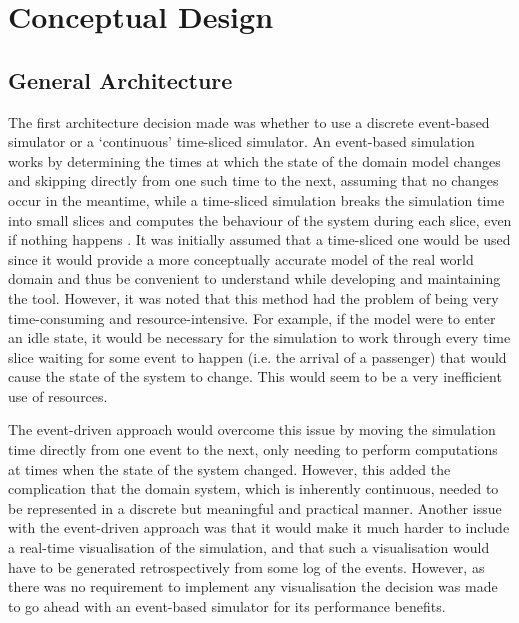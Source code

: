 \documentclass{UoYCSproject}
\begin{document}
\section{Conceptual Design}

\subsection{General Architecture}
\label{cesarchitecture}

The first architecture decision made was whether to use a discrete event-based simulator or a `continuous' time-sliced simulator.  An event-based simulation works by determining the times at which the state of the domain model changes and skipping directly from one such time to the next, assuming that no changes occur in the meantime, while a time-sliced simulation breaks the simulation time into small slices and computes the behaviour of the system during each slice, even if nothing happens \citep{Matloff2008}.  It was initially assumed that a time-sliced one would be used since it would provide a more conceptually accurate model of the real world domain and thus be convenient to understand while developing and maintaining the tool.  However, it was noted that this method had the problem of being very time-consuming and resource-intensive.  For example, if the model were to enter an idle state, it would be necessary for the simulation to work through every time slice waiting for some event to happen (i.e. the arrival of a passenger) that would cause the state of the system to change.  This would seem to be a very inefficient use of resources.

The event-driven approach would overcome this issue by moving the simulation time directly from one event to the next, only needing to perform computations at times when the state of the system changed.  However, this added the complication that the domain system, which is inherently continuous, needed to be represented in a discrete but meaningful and practical manner.  Another issue with the event-driven approach was that it would make it much harder to include a real-time visualisation of the simulation, and that such a visualisation would have to be generated retrospectively from some log of the events.  However, as there was no requirement to implement any visualisation the decision was made to go ahead with an event-based simulator for its performance benefits.
\end{document}
